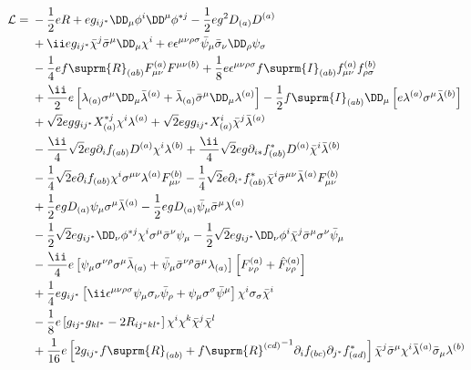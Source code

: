 \def\epsmnrs{\epsilon^{\mu\nu\rho\sigma}}
\def\fR{{f\suprm{R}}}
\def\fI{{f\suprm{I}}}
\begin{align}
 \Lag
={}&
 -\frac12eR
 +eg_{ij^*}\DD_\mu\phi^i\DD^\mu\phi^{*j}
 -\frac12eg^2D_{(a)}D^{(a)}
\notag\\&
 +\ii eg_{ij^*}\bar\chi^j\bSm\DD_\mu\chi^i
 +e\epsmnrs\bar\psi_\mu\bSnd\DD_\rho\psi_\sigma
\notag\\&
 -\frac14e\fR_{(ab)}F^{(a)}_{\mu\nu}F^{\mu\nu(b)}
 +\frac18e\epsmnrs\fI_{(ab)}f^{(a)}_{\mu\nu}f^{(b)}_{\rho\sigma}
\notag\\&
 +\frac\ii2e\left[\lambda_{(a)}\Sm\DD_\mu\bar\lambda^{(a)}
                + \bar\lambda_{(a)}\bSm\DD_\mu\lambda^{(a)}\right]
 -\frac12\fI_{(ab)}\DD_\mu\left[e\lambda^{(a)}\Sm\bar\lambda^{(b)}\right]
\notag\\&
 +\sqrt2egg_{ij^*}X^{*j}_{(a)}\chi^i\lambda^{(a)}
 +\sqrt2egg_{ij^*}X^{i}_{(a)}\bar\chi^j\bar\lambda^{(a)}
\notag\\&
 -\frac\ii4\sqrt2 eg\partial_if_{(ab)}D^{(a)}\chi^i\lambda^{(b)}
 +\frac\ii4\sqrt2 eg\partial_{i*}f^*_{(ab)}D^{(a)}\bar\chi^i\bar\lambda^{(b)}
\notag\\&
 -\frac14\sqrt2e\partial_if_{(ab)}\chi^i\sigma^{\mu\nu}\lambda^{(a)}F^{(b)}_{\mu\nu}
 -\frac14\sqrt2e\partial_{i^*}f^*_{(ab)}\bar\chi^i\bar\sigma^{\mu\nu}\bar\lambda^{(a)}F^{(b)}_{\mu\nu}
\notag\\&
 +\frac12egD_{(a)}\psi_\mu\Sm\bar\lambda^{(a)}
 -\frac12egD_{(a)}\bar\psi_\mu\bSm\lambda^{(a)}
\notag\\&
 -\frac12\sqrt2eg_{ij^*}\DD_\nu\phi^{*j}\chi^i\Sm\bSn\psi_\mu
 -\frac12\sqrt2eg_{ij^*}\DD_\nu\phi^i\bar\chi^j\bSm\Sn\bar\psi_\mu
\notag\\&
-\frac\ii4e\left[\psi_\mu\sigma^{\nu\rho}\Sm\bar\lambda_{(a)}
               + \bar\psi_\mu\bar\sigma^{\nu\rho}\bSm\lambda_{(a)}\right]
           \left[F^{(a)}_{\nu\rho}+\hat F^{(a)}_{\nu\rho}\right]
\notag\\&
+\frac14eg_{ij^*}\left[\ii\epsmnrs\psi_\mu\sigma_\nu\bar\psi_\rho
                     + \psi_\mu\Ss\bar\psi^\mu\right]
                 \chi^i\sigma_\sigma\bar\chi^i
\notag\\&
-\frac18e\left[g_{ij^*}g_{kl^*}-2R_{ij^*kl^*}\right]\chi^i\chi^k\bar\chi^j\bar\chi^l
\notag\\&
+\frac1{16}e\left[2g_{ij^*}\fR_{(ab)}
                + {\fR^{(cd)}}^{-1}\partial_if_{(bc)}\partial_{j^*}f^*_{(ad)}\right]
            \bar\chi^j\bSm\chi^i\bar\lambda^{(a)}\bar\sigma_\mu\lambda^{(b)}
\notag\\&

\end{align}
